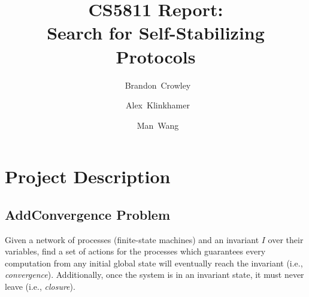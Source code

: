 


\usepackage{tikz}
\usetikzlibrary{arrows}

\usepackage{float}

\usepackage{algorithm}
\usepackage{algorithmic}

\setlength{\abovedisplayskip}{0.5em}
\setlength{\abovedisplayshortskip}{0.5em}
\setlength{\belowdisplayskip}{0.5em}
\setlength{\belowdisplayshortskip}{0.5em}
\setlength{\abovecaptionskip}{0.0em}
\setlength{\belowcaptionskip}{0.0em}

\def\imagetop#1{\vtop{\null\hbox{#1}}}

\newcommand{\xnsysinst}[3]{%
\begin{figure}[H]
\begin{tabular}[c]{l|l}
 \imagetop{#2} &
 \imagetop{\begin{tabular}[c]{@{}l@{}}#3\end{tabular}} \\
\end{tabular}
\caption{Problem instance: \texttt{#1}}
\end{figure}}

\newcommand{\unique}{\exists!}


\title{
 CS5811 Report:\\
 Search for Self-Stabilizing Protocols
}

\author{~Brandon~Crowley\and~Alex~Klinkhamer\and~Man~Wang}
\maketitle

\tableofcontents

\section{Project Description}

\subsection{AddConvergence Problem}

Given a network of processes (finite-state machines) and an invariant $I$ over their variables, find a set of actions for the processes which guarantees every computation from any initial global state will eventually reach the invariant (i.e., {\it convergence}).
Additionally, once the system is in an invariant state, it must never leave (i.e., {\it closure}).


